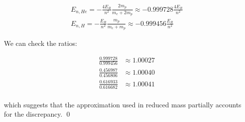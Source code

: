 \documentclass[12pt]{article}
\begin{document}
\begin{equation}
    \begin{split}
        E_{n, He} = -\frac{4E_{R}}{n^{2}} \frac{2m_{p}}{m_{e} + 2m_{p}} \approx -0.999728 \frac{4E_{R}}{n^{2}} \\
        E_{n, H} = -\frac{E_{R}}{n^{2}} \frac{m_{p}}{m_{e} + m_{p}} \approx -0.999456 \frac{E_{R}}{n^{2}}
    \end{split}
\end{equation}

We can check the ratios:

\begin{equation}
    \begin{split}
        \frac{0.999728}{0.999456} &\approx 1.00027 \\
        \frac{0.456987}{0.456806} &\approx 1.00040 \\
        \frac{0.616933}{0.616682} &\approx 1.00041 \\
    \end{split}
\end{equation}

which suggests that the approximation used in reduced mass partially accounts for the discrepancy.
\qed
\end{document}
